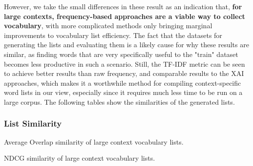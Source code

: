 However, we take the small differences in these result as an indication that, \textbf{for large contexts, frequency-based approaches are a viable way to collect vocabulary}, with more complicated methods only bringing marginal improvements to vocabulary list efficiency.
The fact that the datasets for generating the lists and evaluating them is a likely cause for why these results are similar, as finding words that are very specifically useful to the "train" dataset becomes less productive in such a scenario.
Still, the TF-IDF metric can be seen to achieve better results than raw frequency, and comparable results to the XAI approaches, which makes it a worthwhile method for compiling context-specific word lists in our view, especially since it requires much less time to be run on a large corpus.
The following tables show the similarities of the generated lists.

\subsubsection{List Similarity}

\begin{table}[H]
	\centering
	\resizebox{\textwidth}{!}{%
		
	}
	\caption{Average Overlap similarity of large context vocabulary lists.}
	\label{tbl:similarity-results-big-average-overlap}
\end{table}

\begin{table}[H]
	\centering
	\resizebox{\textwidth}{!}{%
		
	}
	\caption{NDCG similarity of large context vocabulary lists.}
	\label{tbl:similarity-results-big-ndcg}
\end{table}





% 	


% 		

